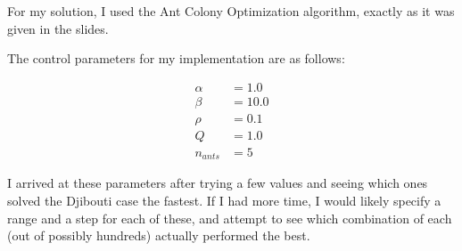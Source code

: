 \documentclass{article}
\begin{document}
For my solution, I used the Ant Colony Optimization algorithm, exactly as it
was given in the slides.

The control parameters for my implementation are as follows:

\begin{align*}
    \alpha &= 1.0\\
    \beta &= 10.0\\
    \rho &= 0.1\\
    Q &= 1.0\\
    n_{ants} &= 5
\end{align*}

I arrived at these parameters after trying a few values and seeing which ones
solved the Djibouti case the fastest. If I had more time, I would likely specify
a range and a step for each of these, and attempt to see which combination of
each (out of possibly hundreds) actually performed the best.
\end{document}
